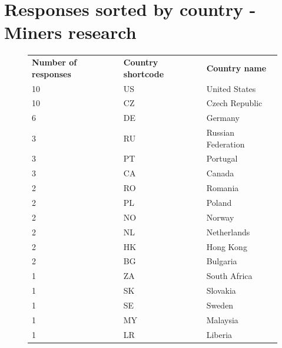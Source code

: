 \documentclass[
  printed, %
  table,   %
  lof,     %
  lot,     %
           oneside, color
]{fithesis3}
\begin{document}
\chapter{Responses sorted by country - Miners research}
\vspace{-2em}
\begin{figure}[H]
\center
\begin{tabular}{lll}
\textbf{Number of responses} & \textbf{Country shortcode} & \textbf{Country name} \\
10                           & US                         & United States         \\
10                           & CZ                         & Czech Republic        \\
6                            & DE                         & Germany               \\
3                            & RU                         & Russian Federation    \\
3                            & PT                         & Portugal              \\
3                            & CA                         & Canada                \\
2                            & RO                         & Romania               \\
2                            & PL                         & Poland                \\
2                            & NO                         & Norway                \\
2                            & NL                         & Netherlands           \\
2                            & HK                         & Hong Kong             \\
2                            & BG                         & Bulgaria              \\
1                            & ZA                         & South Africa          \\
1                            & SK                         & Slovakia              \\
1                            & SE                         & Sweden                \\
1                            & MY                         & Malaysia              \\
1                            & LR                         & Liberia               \\

\end{tabular}
\end{figure}
\end{document}
